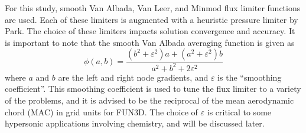 For this study, smooth Van Albada\cite{van1997comparative}, Van
Leer\cite{vatsa2009calibration}, and Minmod\cite{roe1986characteristic} flux
limiter functions are used.  Each of these limiters is augmented with a
heuristic pressure limiter by Park\cite{park2008anisotropic}. The choice of
these limiters impacts solution convergence and accuracy.  It is important to
note that the smooth Van Albada averaging function is given as
\begin{equation}
  \phi\left( a, b \right) =
  \frac{(b^2 + \varepsilon^2)a + (a^2 + \varepsilon^2)b}
  {a^2 + b^2 + 2\varepsilon^2}
  \label{van-albada-avg}
\end{equation}
where $a$ and $b$ are the left and right node gradients, and $\varepsilon$ is
the ``smoothing coefficient''.  This smoothing coefficient is used to tune the
flux limiter to a variety of the problems, and it is advised to be the
reciprocal of the mean aerodynamic chord (MAC) in grid units for
FUN3D\cite{biedron2016fun3d}.  The choice of $\varepsilon$ is critical to some
hypersonic applications involving chemistry, and will be discussed later.

